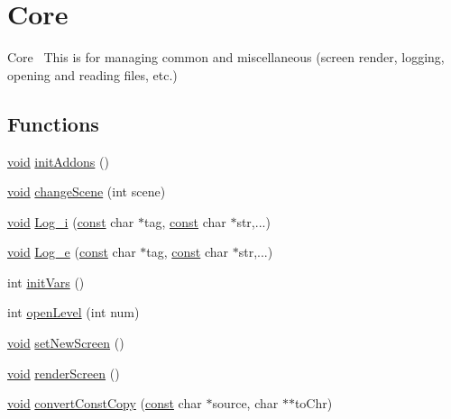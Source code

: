 \hypertarget{group___core}{}\section{Core}
\label{group___core}


Core~\newline
This is for managing common and miscellaneous (screen render, logging, opening and reading files, etc.)  


\subsection*{Functions}
\begin{DoxyCompactItemize}
\item 
\hyperlink{png_8h_ac9c84fa68bbad002983e35ce3663c686}{void} \hyperlink{group___core_gad48a041724bbc05fba4b66ce7530edb2}{init\+Addons} ()
\item 
\hyperlink{png_8h_ac9c84fa68bbad002983e35ce3663c686}{void} \hyperlink{group___core_ga02ff5c3ae037f5e07455e6e31faa8012}{change\+Scene} (int scene)
\item 
\hyperlink{png_8h_ac9c84fa68bbad002983e35ce3663c686}{void} \hyperlink{group___core_ga1160e13b7fea6357aae71e25703481de}{Log\+\_\+i} (\hyperlink{zconf_8h_a2c212835823e3c54a8ab6d95c652660e}{const} char $\ast$tag, \hyperlink{zconf_8h_a2c212835823e3c54a8ab6d95c652660e}{const} char $\ast$str,...)
\item 
\hyperlink{png_8h_ac9c84fa68bbad002983e35ce3663c686}{void} \hyperlink{group___core_ga5a29994cc1a93c0124f65b27a5daa5aa}{Log\+\_\+e} (\hyperlink{zconf_8h_a2c212835823e3c54a8ab6d95c652660e}{const} char $\ast$tag, \hyperlink{zconf_8h_a2c212835823e3c54a8ab6d95c652660e}{const} char $\ast$str,...)
\item 
int \hyperlink{group___core_ga5556333d0547b17be08de1a701d61e2c}{init\+Vars} ()
\item 
int \hyperlink{group___core_ga26c5e4f4587adfc14630f09bf91338ba}{open\+Level} (int num)
\item 
\hyperlink{png_8h_ac9c84fa68bbad002983e35ce3663c686}{void} \hyperlink{group___core_ga235968ecd656b8f1436aebad7eeaa5b8}{set\+New\+Screen} ()
\item 
\hyperlink{png_8h_ac9c84fa68bbad002983e35ce3663c686}{void} \hyperlink{group___core_ga6270007e1f0c1a21e81dc3c5bdee14a6}{render\+Screen} ()
\item 
\hyperlink{png_8h_ac9c84fa68bbad002983e35ce3663c686}{void} \hyperlink{group___core_ga408edec4092671024a17603aebcc9225}{convert\+Const\+Copy} (\hyperlink{zconf_8h_a2c212835823e3c54a8ab6d95c652660e}{const} char $\ast$source, char $\ast$$\ast$to\+Chr)
$$
\end{DoxyCompactItemize}
